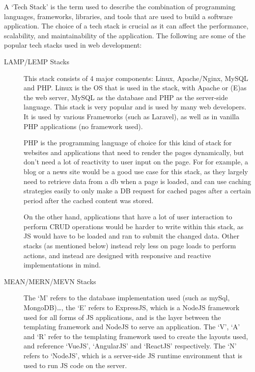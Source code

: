 \documentclass[11pt, a4paper,twoside]{report}
\theoremstyle{plain} %
\theoremstyle{definition} %
\numberwithin{equation}{chapter}
\begin{document}
A `Tech Stack' is the term used to describe the combination of programming
languages, frameworks, libraries, and tools that are used to build a software
application. The choice of a tech stack is crucial as it can affect the
performance, scalability, and maintainability of the application. The following
are some of the popular tech stacks used in web development:

\begin{description}
    \item[LAMP/LEMP Stacks] {
        This stack consists of 4 major components: Linux, Apache/Nginx, MySQL
        and PHP\@. Linux is the OS that is used in the stack, with Apache or
        (E)\@nginx as the web server, MySQL as the database and PHP as the
        server-side language. This stack is very popular and is used by many
        web developers. It is used by various Frameworks (such as Laravel), as
        well as in vanilla PHP applications (no framework used).

        PHP is the programming language of choice for this kind of stack for
        websites and applications that need to render the pages dynamically,
        but don't need a lot of reactivity to user input on the page. For
        for example, a blog or a news site would be a good use case for this
        stack, as they largely need to retrieve data from a db when a page is
        loaded, and can use caching strategies easily to only make a DB request
        for cached pages after a certain period after the cached content was
        stored.

        On the other hand, applications that have a lot of user interaction to
        perform CRUD operations would be harder to write within this stack, as
        JS would have to be loaded and ran to submit the changed data. Other
        stacks (as mentioned below) instead rely less on page loads to perform
        actions, and instead are designed with responsive and reactive
        implementations in mind.
        }
    \item[MEAN/MERN/MEVN Stacks] {
        The `M' refers to the database implementation used (such as mySql,
        MongoDB)\ldots, the `E' refers to ExpressJS, which is a NodeJS
        framework used for all forms of JS applications, and is the layer
        between the templating framework and NodeJS to serve an application.
        The `V', `A' and `R' refer to the templating framework used to create
        the layouts used, and reference `VueJS', `AngularJS' and `ReactJS'
        respectively. The `N' refers to `NodeJS', which is a server-side JS
        runtime environment that is used to run JS code on the server.

}
\end{description}
\end{document}
